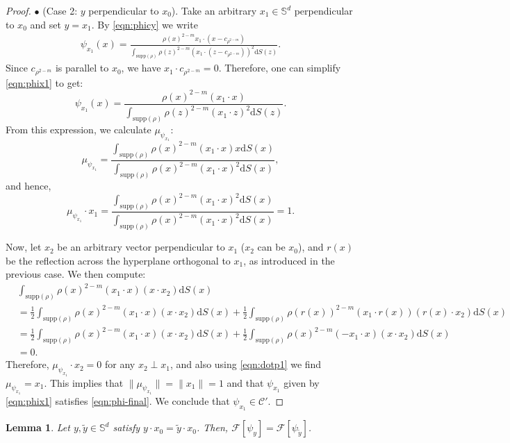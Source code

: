 \documentclass[11pt]{amsart}
\newtheorem{lemma}{Lemma}[section]
\newcommand{\bbs}{\mathbb S}
\newcommand{\dx}{\mathrm{d}S (x)}
\newcommand{\dz}{\mathrm{d}S (z)}
\newcommand{\supp}{\mathrm{supp}(\rho)}
\newcommand{\dm}{d} %
\begin{document}
\begin{proof}
\noindent$\bullet$ (Case 2: $y$ perpendicular to $x_0$). Take an arbitrary $x_1 \in \bbs^\dm$ perpendicular to $x_0$ and set $y=x_1$. By \eqref{eqn:phicy} we write
\begin{align}\label{eqn:phix1}
\psi_{x_1}(x)=\frac{\rho(x)^{2-m}x_1\cdot(x-c_{\rho^{2-m}})}{\int_{\supp}\rho(z)^{2-m}\left(x_1\cdot (z-c_{\rho^{2-m}})\right)^2\dz}.
\end{align}
Since $c_{\rho^{2-m}}$ is parallel to $x_0$, we have $x_1\cdot c_{\rho^{2-m}}=0$. Therefore, one can simplify \eqref{eqn:phix1} to get:
\[
\psi_{x_1}(x)=\frac{\rho(x)^{2-m}\left(x_1\cdot x\right)}{\int_{\supp}\rho(z)^{2-m}\left(x_1\cdot z\right)^2\dz}.
\]
From this expression, we calculate $\mu_{\psi_{x_1}}$:
\[
\mu_{\psi_{x_1}}=\frac{\int_{\supp}\rho(x)^{2-m}\left(x_1\cdot x\right)x\dx}{\int_{\supp}\rho(x)^{2-m}\left(x_1\cdot x\right)^2\dx},
\]
and hence,
\begin{equation}
\label{eqn:dotp1}
\mu_{\psi_{x_1}}\cdot x_1=\frac{\int_{\supp}\rho(x)^{2-m}\left(x_1\cdot x\right)^2\dx}{\int_{\supp}\rho(x)^{2-m}\left(x_1\cdot x\right)^2\dx}=1.
\end{equation}

Now, let $x_2$ be an arbitrary vector perpendicular to $x_1$ ($x_2$ can be $x_0$), and $r(x)$ be the reflection across the hyperplane orthogonal to $x_1$, as introduced in the previous case. We then compute:
\begin{align*}
&\int_{\supp}\rho(x)^{2-m}\left(x_1\cdot x\right)(x\cdot x_2)\dx\\[2pt]
&=\frac{1}{2}\int_{\supp}\rho(x)^{2-m}\left(x_1\cdot x\right)(x\cdot x_2)\dx+\frac{1}{2}\int_{\supp}\rho(r(x))^{2-m}\left(x_1\cdot r(x)\right)(r(x)\cdot x_2)\dx\\[2pt]
&=\frac{1}{2}\int_{\supp}\rho(x)^{2-m}\left(x_1\cdot x\right)(x\cdot x_2)\dx+\frac{1}{2}\int_{\supp}\rho(x)^{2-m}\left(-x_1\cdot x\right)(x\cdot x_2)\dx \\[2pt]
&=0.
\end{align*}
Therefore, $\mu_{\psi_{x_1}} \cdot x_2 = 0$ for any $x_2 \perp x_1$, and also using \eqref{eqn:dotp1} we find $\mu_{\psi_{x_1}}=x_1$. This  implies that $\|\mu_{\psi_{x_1}}\|=\|x_1\|=1$ and that $\psi_{x_1}$ given by \eqref{eqn:phix1} satisfies \eqref{eqn:phi-final}. We conclude that $\psi_{x_1}\in\mathcal{C}'$.
\end{proof}



\begin{lemma}
\label{lem:F=F}
Let $y,\tilde{y}\in\bbs^\dm$ satisfy $y\cdot x_0=\tilde{y}\cdot x_0$. Then, $\mathcal{F}[\psi_{y}]=\mathcal{F}[\psi_{\tilde{y}}]$.
\end{lemma}
\end{document}
